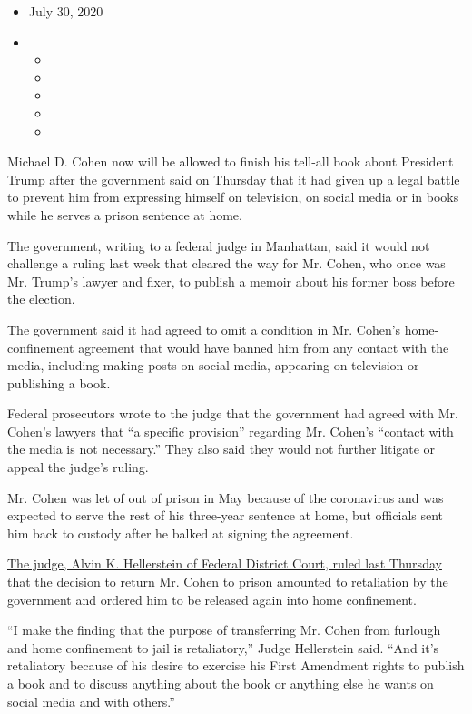 \begin{itemize}
\item
  July 30, 2020
\item
  \begin{itemize}
  \item
  \item
  \item
  \item
  \item
  \end{itemize}
\end{itemize}

Michael D. Cohen now will be allowed to finish his tell-all book about
President Trump after the government said on Thursday that it had given
up a legal battle to prevent him from expressing himself on television,
on social media or in books while he serves a prison sentence at home.

The government, writing to a federal judge in Manhattan, said it would
not challenge a ruling last week that cleared the way for Mr. Cohen, who
once was Mr. Trump's lawyer and fixer, to publish a memoir about his
former boss before the election.

The government said it had agreed to omit a condition in Mr. Cohen's
home-confinement agreement that would have banned him from any contact
with the media, including making posts on social media, appearing on
television or publishing a book.

Federal prosecutors wrote to the judge that the government had agreed
with Mr. Cohen's lawyers that ``a specific provision'' regarding Mr.
Cohen's ``contact with the media is not necessary.'' They also said they
would not further litigate or appeal the judge's ruling.

Mr. Cohen was let of out of prison in May because of the coronavirus and
was expected to serve the rest of his three-year sentence at home, but
officials sent him back to custody after he balked at signing the
agreement.

\href{https://www.nytimes3xbfgragh.onion/2020/07/23/nyregion/michael-cohen-trump-book.html}{The
judge, Alvin K. Hellerstein of Federal District Court, ruled last
Thursday that the decision to return Mr. Cohen to prison amounted to
retaliation} by the government and ordered him to be released again into
home confinement.

``I make the finding that the purpose of transferring Mr. Cohen from
furlough and home confinement to jail is retaliatory,'' Judge
Hellerstein said. ``And it's retaliatory because of his desire to
exercise his First Amendment rights to publish a book and to discuss
anything about the book or anything else he wants on social media and
with others.''

